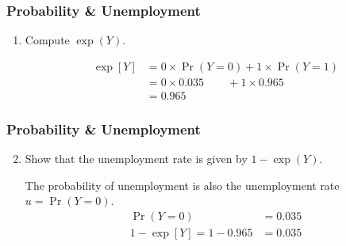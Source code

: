 \begin{frame}
\frametitle{Probability \& Unemployment}
\begin{enumerate}\setcounter{enumi}{0}

\item Compute $\exp(Y)$.

\begin{answer}
\begin{align*}
\exp[Y] 
  & = 0 \times \Pr(Y=0) + 1 \times \Pr(Y=1) \\
  & = 0 \times 0.035 \hspace{25pt} + 1 \times 0.965 \\
  & = 0.965
\end{align*}
\end{answer}

\end{enumerate}
\end{frame}


\begin{frame}
\frametitle{Probability \& Unemployment}
\begin{enumerate}\setcounter{enumi}{1}

\item Show that the unemployment rate is given by $1-\exp(Y)$.

\begin{answer}
The probability of unemployment is also the unemployment rate $u=\Pr(Y=0)$.
\begin{align*}
\Pr(Y=0) 
  & = 0.035 \\ 
1 - \exp[Y] = 1 - 0.965 
  & = 0.035
\end{align*}
\end{answer}

\end{enumerate}
\end{frame}


